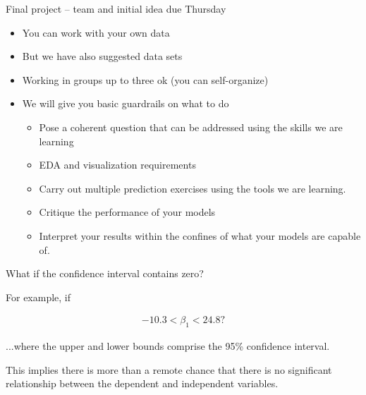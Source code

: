 \documentclass[aspectratio=169, handout]{beamer}
\begin{document}
\begin{frame}{Final project -- team and initial idea due Thursday}

\begin{itemize}
\item You can work with your own data
\item But we have also suggested data sets
\item Working in groups up to three ok (you can self-organize)
\item We will give you basic guardrails on what to do
\begin{itemize}
\item Pose a coherent question that can be addressed using the skills we are learning
\item EDA and visualization requirements
\item Carry out multiple prediction exercises using the tools we are learning.
\item Critique the performance of your models
\item Interpret your results within the confines of what your models are capable of.
\end{itemize}
\end{itemize}

\end{frame}

\begin{frame}{What if the confidence interval contains zero?}

For example, if
   
\begin{align*}
  -10.3 < \beta_1 < 24.8?
\end{align*}

...where the upper and lower bounds comprise the 95\% confidence interval.

\pause

\vspace{5mm}
This implies there is more than a remote chance that there is no significant relationship between the dependent and independent variables.  

\end{frame}
\end{document}
